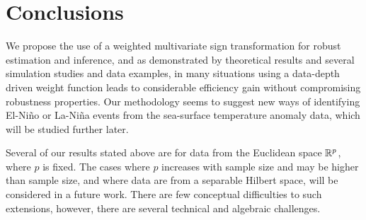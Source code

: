 \section{Conclusions}
\label{Sec:Conclusion}

We propose the use of a weighted multivariate sign transformation for robust 
estimation and inference, and as demonstrated by theoretical results and several 
simulation studies and data examples, in many situations using a data-depth driven weight 
function leads to considerable efficiency gain without compromising robustness 
properties. Our methodology seems to suggest new ways of identifying 
El-Ni\~no or La-Ni\~na events from the sea-surface temperature anomaly data, 
which will be studied further later.

Several of our results stated above are for data from the Euclidean space ${\mathbb{R}}^{p}$, where 
$p$ is fixed. The cases where $p$ increases with sample size and may be higher than sample 
size, and where data are from a separable Hilbert space, will be considered in a future 
work. There are few conceptual difficulties to such extensions, however, there are 
several technical and algebraic challenges. 


